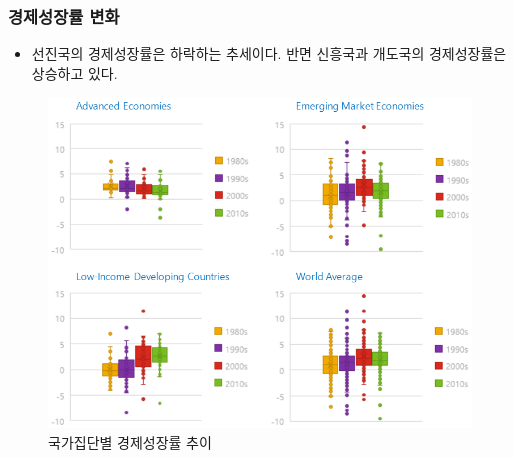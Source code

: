 \documentclass[handout, 10pt]{beamer}
\begin{document}
\begin{frame}[<+->]
\frametitle{경제성장률 변화}
    \begin{itemize}
        \item 선진국의 경제성장률은 하락하는 추세이다. 반면 신흥국과 개도국의 경제성장률은 상승하고 있다.
    \end{itemize}
    \begin{figure}[htpb]
        \begin{center}
            \caption{국가집단별 경제성장률 추이}
            \includegraphics[scale=0.35]{pic/Average Growth in GDP per capita across Country Groups.png}
        \end{center}
    \end{figure}
\end{frame}
\end{document}
